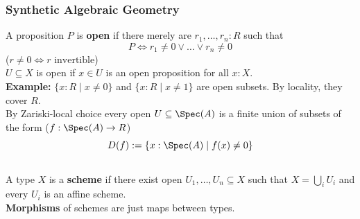 \documentclass{beamer}
\begin{document}
\begin{frame}
  \frametitle{\textbf{Synthetic Algebraic Geometry}}
  A proposition $P$ is \textbf{open} if there merely are $r_1,\dots,r_n:R$
  such that
  \[ P \Leftrightarrow r_1\neq 0 \vee \dots \vee r_n\neq 0\]
  \pause
  ($r\neq 0 \Leftrightarrow r\text{ invertible}$) \\
  \pause
  $U\subseteq X$ is open if $x\in U$ is an open proposition for all $x:X$. \\
  \pause
  \textbf{Example:} $\{x:R\mid x\neq 0\}$ and $\{x:R\mid x\neq 1\}$ are open subsets. By locality, they cover $R$. \\
  \vspace{5mm}
  \pause
  By Zariski-local choice every open $U\subseteq \Spec(A)$ is a finite union of subsets of the form ($f:\Spec(A)\to R$)
  \[ D(f) := \{x:\Spec(A) \mid f(x)\neq 0 \} \] \\
  \pause
  A type $X$ is a \textbf{scheme} if
  there exist open $U_1, \dots, U_n \subseteq X$
  such that $X = \bigcup_i U_i$
  and every $U_i$ is an affine scheme. \\
  \vspace{5mm}
  \pause
  \textbf{Morphisms} of schemes are just maps between types.
  
\end{frame}
\end{document}
